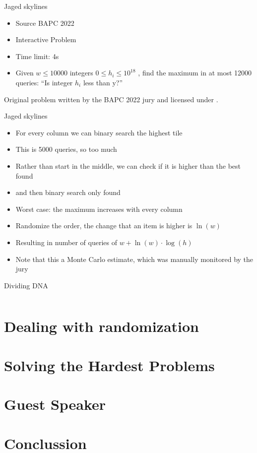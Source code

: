 \documentclass[11pt,pdf, aspectratio=169]{beamer}
\begin{document}
  \begin{frame}{Jaged skylines}
    \begin{itemize}
      \item Source BAPC 2022
      \item Interactive Problem
      \item Time limit: 4s
      \item  Given $w \leq 10000$ integers $0 \leq h_i \leq 10^{18}$ , find the maximum in at most 12000 queries: ``Is integer $h_i$ less than y?''
    \end{itemize}
    Original problem written by the BAPC 2022 jury and licensed under \doclicenseLongNameRef.

    \doclicenseImage
  \end{frame}
  \begin{frame}{Jaged skylines}
    \begin{itemize}
      \item For every column we can binary search the highest tile
      \item This is 5000 queries, so too much
      \item Rather than start in the middle, we can check if it is higher than the best found
      \item and then binary search only found
      \item Worst case: the maximum increases with every column
      \item Randomize the order, the change that an item is higher is $\ln(w)$
      \item Resulting in number of queries of $w+\ln(w)\cdot \log(h)$
      \item Note that this a Monte Carlo estimate, which was manually monitored by the jury
    \end{itemize}
  \end{frame}
  \begin{frame}[containsverbatim]{Dividing DNA}
    \inputminted{python}{code/session-4/bapc-j.py}
  \end{frame}

  \section{Dealing with randomization}


  \section{Solving the Hardest Problems}


  \section{Guest Speaker}


  \section{Conclussion}
\end{document}
